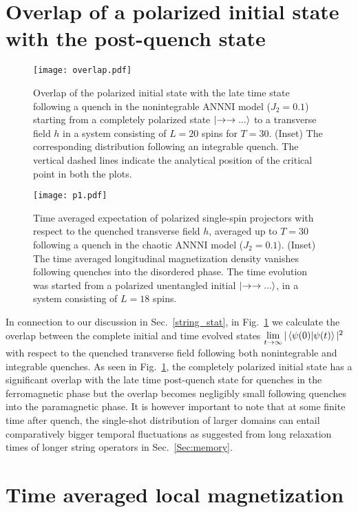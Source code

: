\documentclass[aps,prx,twocolumn]{revtex4-2}
\begin{document}
{{\section{Overlap of a polarized initial state with the post-quench state}
\label{Sec: Appendix_2}

\begin{figure}
	\centering
	\texttt{[image: overlap.pdf]}
	
	\caption{Overlap of the polarized initial state with the late time state following a quench in the nonintegrable ANNNI model ($J_2=0.1$) starting from a completely polarized state $\ket{\rightarrow\rightarrow...}$ to a transverse field $h$ in a system consisting of $L=20$ spins for $T=30$. (Inset) The corresponding distribution following an integrable quench. The vertical dashed lines indicate the analytical position of the critical point in both the plots.}
	\label{fig:11} 
\end{figure}
\begin{figure}
	\centering
	\texttt{[image: p1.pdf]}
	
	\caption{ Time averaged expectation of polarized single-spin projectors with respect to the quenched transverse field $h$, averaged up to $T=30$ following a quench in the chaotic ANNNI model ($J_2=0.1$). (Inset) The time averaged longitudinal magnetization density vanishes following quenches into the disordered phase. The time evolution was started from a polarized unentangled initial $\ket{\rightarrow\rightarrow...}$, in a system consisting of $L=18$ spins.}
	\label{fig:12} 
\end{figure}
In connection to our discussion in Sec.~\ref{string_stat}, in Fig.~\ref{fig:11} we calculate the overlap between the complete initial and time evolved states   $\lim\limits_{t\rightarrow\infty}|\braket{\psi(0)|\psi(t)}|^2$ with respect to the quenched transverse field following both nonintegrable and integrable quenches. As seen in Fig.~\ref{fig:11}, the completely polarized initial state has a significant overlap with the late time post-quench state for quenches in the ferromagnetic phase but the overlap becomes negligibly small following quenches into the paramagnetic phase. It is however important to note that at some finite time after quench, the single-shot distribution of larger domains can entail comparatively bigger temporal fluctuations as suggested from long relaxation times of longer string operators in Sec.~\ref{Sec:memory}.


\section{Time averaged local magnetization}
\label{Sec:Appendix_3}

}}
\end{document}
